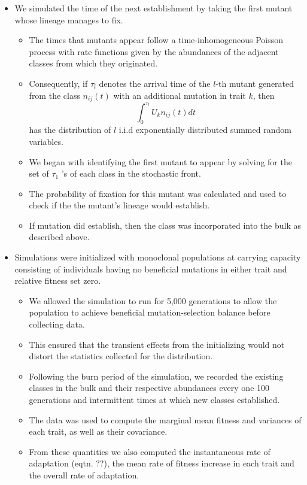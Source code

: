 \documentclass[11pt,one column]{article}
\begin{document}
\begin{itemize}
\item We simulated the time of the next establishment by taking the first mutant whose lineage manages to fix. 
\begin{itemize}
\item The times that mutants appear follow a time-inhomogeneous Poisson process with rate functions given by the abundances of the adjacent classes from which they originated. 
\item Consequently, if $\tau_l$ denotes the arrival time of the $l$-th mutant generated from the class $n_{ij}(t)$ with an additional mutation in trait $k$, then \[ \int_0^{\tau_l} U_k n_{ij}(t) dt \] has the distribution of $l$ i.i.d exponentially distributed summed random variables. 
\item We began with identifying the first mutant to appear by solving for the set of $\tau_1$ 's of each class in the stochastic front.  
\item The probability of fixation for this mutant was calculated and used to check if the the mutant's lineage would establish.  
\item If mutation did establish, then the class was incorporated into the bulk as described above.  
\end{itemize}

\item Simulations were initialized with monoclonal populations at carrying capacity consisting of individuals having no beneficial mutations in either trait and relative fitness set zero.
\begin{itemize}
\item We allowed the simulation to run for 5,000 generations to allow the population to achieve beneficial mutation-selection balance before collecting data.
\item This ensured that the transient effects from the initializing would not distort the statistics collected for the distribution.
\item Following the burn period of the simulation, we recorded the existing classes in the bulk and their respective abundances every one 100 generations and intermittent times at which new classes established.
\item The data was used to compute the marginal mean fitness and variances of each trait, as well as their covariance.
\item From these quantities we also computed the instantaneous rate of adaptation (eqtn. ??), the mean rate of fitness increase in each trait and the overall rate of adaptation.
\end{itemize}

\end{itemize}
\end{document}
